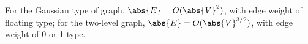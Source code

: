 For the Gaussian type of graph, $\abs{E} = O(\abs{V}^2)$, with edge weight of floating type;
for the two-level graph, $\abs{E} = O(\abs{V}^{3/2})$, with edge weight of 0 or 1 type.
